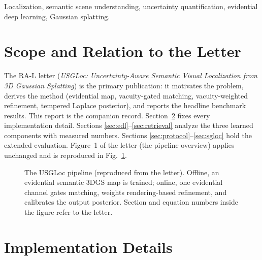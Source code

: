 \documentclass[journal]{IEEEtran}
\newcommand{\method}{USGLoc}
\begin{document}
\begin{IEEEkeywords}
Localization, semantic scene understanding, uncertainty quantification,
evidential deep learning, Gaussian splatting.
\end{IEEEkeywords}

\section{Scope and Relation to the Letter}
The RA-L letter (\emph{\method{}: Uncertainty-Aware Semantic Visual
Localization from 3D Gaussian Splatting}) is the primary publication: it
motivates the problem, derives the method (evidential map, vacuity-gated
matching, vacuity-weighted refinement, tempered Laplace posterior), and
reports the headline benchmark results. This report is the companion record.
Section~\ref{sec:impl} fixes every implementation detail. Sections
\ref{sec:edl}--\ref{sec:retrieval} analyze the three learned components with
measured numbers. Sections \ref{sec:protocol}--\ref{sec:sgloc} hold the
extended evaluation. Figure~1 of the letter (the pipeline overview) applies
unchanged and is reproduced in Fig.~\ref{fig:overview}.

\begin{figure}[t]
  \centering
  \resizebox{\textwidth}{!}{}
  \caption{The \method{} pipeline (reproduced from the letter). Offline, an
  evidential semantic 3DGS map is trained; online, one evidential channel
  gates matching, weights rendering-based refinement, and calibrates the output posterior. Section and equation numbers inside the figure refer to the letter.}
  \label{fig:overview}
\end{figure}

\section{Implementation Details}
\label{sec:impl}
\end{document}
